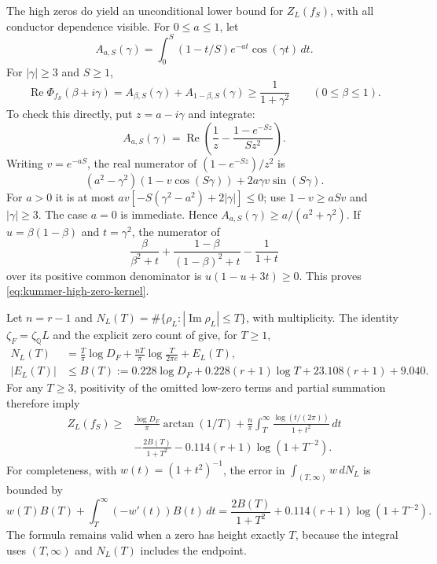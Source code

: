 \documentclass[11pt]{article}
\theoremstyle{definition}
\theoremstyle{remark}
\begin{document}
The high zeros do yield an unconditional lower bound for
$Z_L(f_S)$, with all conductor dependence visible.
For $0\leq a\leq1$, let
\[
 A_{a,S}(\gamma)=\int_0^S(1-t/S)e^{-at}\cos(\gamma t)\,dt.
\]
For $|\gamma|\geq3$ and $S\geq1$,
\begin{equation}\label{eq:kummer-high-zero-kernel}
 \operatorname{Re}\Phi_{f_S}(\beta+i\gamma)
 = A_{\beta,S}(\gamma)+A_{1-\beta,S}(\gamma)
 \geq\frac1{1+\gamma^2}
 \qquad(0\leq\beta\leq1).
\end{equation}
To check this directly, put $z=a-i\gamma$ and integrate:
\[
 A_{a,S}(\gamma)
 =\operatorname{Re}\left(
       \frac1z-\frac{1-e^{-Sz}}{Sz^2}\right).
\]
Writing $v=e^{-aS}$, the real numerator of
$(1-e^{-Sz})/z^2$ is
\[
 (a^2-\gamma^2)(1-v\cos(S\gamma))
                  +2a\gamma v\sin(S\gamma).
\]
For $a>0$ it is at most
$av[-S(\gamma^2-a^2)+2|\gamma|]\leq0$;
use $1-v\geq aSv$ and $|\gamma|\geq3$.
The case $a=0$ is immediate.  Hence
$A_{a,S}(\gamma)\geq a/(a^2+\gamma^2)$.
If $u=\beta(1-\beta)$ and $t=\gamma^2$, the numerator of
\[
 \frac{\beta}{\beta^2+t}
 +\frac{1-\beta}{(1-\beta)^2+t}-\frac1{1+t}
\]
over its positive common denominator is
$u(1-u+3t)\geq0$.  This proves
\eqref{eq:kummer-high-zero-kernel}.

Let $n=r-1$ and $N_L(T)=\#\{\rho_L:|\operatorname{Im}\rho_L|\leq T\}$,
with multiplicity.  The identity $\zeta_F=\zeta_{\mathbb Q}L$
and the explicit zero count of
\citet[Corollary~1.2, p.~278]{HSW2022} give, for $T\geq1$,
\begin{align}
 N_L(T)&=\frac T\pi\log D_F
             +\frac{nT}\pi\log\frac{T}{2\pi e}+E_L(T),
             \label{eq:kummer-zero-count}\\
 |E_L(T)|&\leq B(T):=
 0.228\log D_F+0.228(r+1)\log T
                +23.108(r+1)+9.040.\nonumber
\end{align}
For any $T\geq3$, positivity of the omitted low-zero terms
and partial summation therefore imply
\begin{align}
 Z_L(f_S)\geq{}&
 \frac{\log D_F}{\pi}\arctan(1/T)
 +\frac n\pi\int_T^\infty
          \frac{\log(t/(2\pi))}{1+t^2}\,dt
 \label{eq:kummer-high-zero-bound}\\
 &-\frac{2B(T)}{1+T^2}
 -0.114(r+1)\log(1+T^{-2}).\nonumber
\end{align}
For completeness, with $w(t)=(1+t^2)^{-1}$, the error in
$\int_{(T,\infty)}w\,dN_L$ is bounded by
\[
 w(T)B(T)+\int_T^\infty(-w'(t))B(t)\,dt
 =\frac{2B(T)}{1+T^2}
   +0.114(r+1)\log(1+T^{-2}).
\]
The formula remains valid when a zero has height exactly
$T$, because the integral uses $(T,\infty)$ and $N_L(T)$
includes the endpoint.
\end{document}
